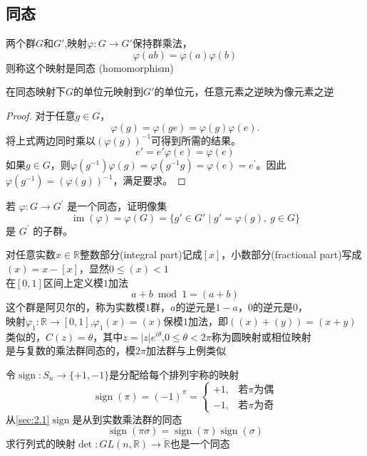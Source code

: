 \subsection{同态}
两个群$G$和$G'$,映射$\varphi : G \rightarrow G'$保持群乘法，$$
\varphi(a b)=\varphi(a) \varphi(b)
$$
则称这个映射是同态 (homomorphism)
\begin{theorem}
    在同态映射下$G$的单位元映射到$G'$的单位元，任意元素之逆映为像元素之逆
\end{theorem}
\begin{proof}
    对于任意$g\in G$，
    $$
    \varphi(g)=\varphi(ge)=\varphi(g)\varphi(e).
    $$
    将上式两边同时乘以$(\varphi(g))^{-1}$可得到所需的结果。
    $$e'=e'\varphi(e)=\varphi(e)$$
    如果$g\in G$，则$\varphi(g^{-1})\varphi(g)=\varphi(g^{-1}g)=\varphi(e)=e^{\prime}$。因此$\varphi(g^{-1})=(\varphi(g))^{-1}$，满足要求。
     
\end{proof}
\begin{exercise}
    若 $\varphi: G\to G^{\prime}$ 是一个同态，证明像集
\begin{equation}\label{eq:2.13}
    \operatorname{im}(\varphi)=\varphi(G)=\{g'\in G'\mid g'=\varphi(g),\:g\in G\}        
\end{equation}
    是 $G^{\prime}$ 的子群。
\end{exercise}
\begin{eg}
    对任意实数$x\in \mathbb{R}$整数部分(integral part)记成$[x]$，小数部分(fractional part)写成$(x)=x-[x]$，显然$0 \leqslant(x)<1$\\
    在$[0,1]$区间上定义模\(1\)加法$$
    a+b \bmod 1=(a+b)
    $$
    这个群是阿贝尔的，称为实数模\(1\)群，\(a\)的逆元是\(1-a\)，\(0\)的逆元是\(0\)，\\
    映射$\varphi_{1}: \mathbb{R} \rightarrow [0,1]$,$\varphi_{1}(x)=(x)$保模\(1\)加法，即$((x)+(y))=(x+y)$\\
    类似的，$C(z)=\theta$，其中$z=|z| e^{i \theta}$,$0 \leqslant \theta<2 \pi$称为圆映射或相位映射\\
    是与复数的乘法群同态的，模$2\pi$加法群与上例类似
\end{eg}
\begin{eg}
    令$\operatorname{sign}:  S_{n} \rightarrow\{+1,-1\}$是分配给每个排列宇称的映射
    $$\operatorname{sign}(\pi)=(-1)^{\pi}=\begin{cases}
+1, & \text {若\(\pi\)为偶} \\
-1, & \text {若\(\pi\)为奇}
\end{cases}
$$
从\ref{sec:2.1}$\operatorname{sign}$是从到实数乘法群的同态$$
\operatorname{sign}(\pi \sigma)=\operatorname{sign}(\pi) \operatorname{sign}(\sigma)
$$
求行列式的映射$
\operatorname{det}: G L(n, \mathbb{R}) \rightarrow \dot{\mathbb{R}}
$也是一个同态
\end{eg}
